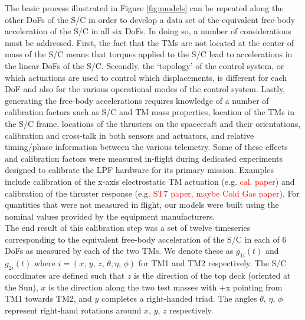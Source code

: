 \documentclass[preprint, trackchanges]{aastex61}
\newcommand{\red}[1]{\textcolor{red}{#1}}
\begin{document}
The basic process illustrated in Figure \ref{fig:models} can be repeated along the other DoFs of the S/C in order to develop a data set of the equivalent free-body acceleration of the S/C in all six DoFs. In doing so, a number of considerations must be addressed. First, the fact that the TMs are not located at the center of mass of the S/C means that torques applied to the S/C lead to accelerations in the linear DoFs of the S/C.  Secondly, the `topology' of the control system, or which actuations are used to control which displacements, is different for each DoF and also for the various operational modes of the control system. Lastly, generating the free-body accelerations requires knowledge of a number of calibration factors such as S/C and TM mass properties, location of the TMs in the S/C frame, locations of the thrusters on the spacecraft and their orientations, calibration and cross-talk in both sensors and actuators, and relative timing/phase information between the various telemetry.  Some of these effects and calibration factors were measured in-flight during dedicated experiments designed to calibrate the LPF hardware for its primary mission. Examples include calibration of the x-axis electrostatic TM actuation (e.g. \red{cal. paper}) and calibration of the thruster response (e.g. \red{ST7 paper, maybe Cold Gas paper}). For quantities that were not measured in flight, our models were built using the nominal values provided by the equipment manufacturers. 
\\
The end result of this calibration step was a set of twelve timeseries corresponding to the equivalent free-body acceleration of the S/C in each of 6 DoFs as measured by each of the two TMs. We denote these as $g_{1i}(t)$ and $g_{2i}(t)$ where $i=\left(x,\,y,\,z,\,\theta,\eta,\,\phi\right)$ for TM1 and TM2 respectively. The S/C coordinates are defined such that $z$ is the direction of the top deck (oriented at the Sun), $x$ is the direction along the two test masses with +x pointing from TM1 towards TM2, and $y$ completes a right-handed triad. The angles $\theta,\,\eta,\,\phi$ represent right-hand rotations around $x,\,y,\,z$ respectively.
\FloatBarrier
\end{document}
